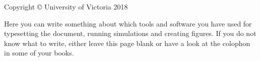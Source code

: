 \thispagestyle{empty}
{\small
\strut\vfill %
\noindent Copyright \copyright{} University of Victoria 2018\par
\vspace{0.2cm}
\noindent Here you can write something about which tools and software you have used for typesetting the document, running simulations and creating figures. If you do not know what to write, either leave this page blank or have a look at the colophon in some of your books.
}
\clearpage

